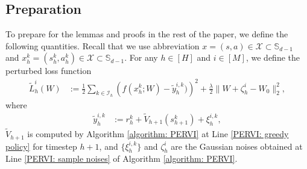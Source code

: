 \documentclass{article} \usepackage{iclr2023/iclr2023_conference,times}
\begin{document}
\subsection{Preparation}
To prepare for the lemmas and proofs in the rest of the paper, we define the following quantities. Recall that we use abbreviation $x = (s,a) \in \mathcal{X} \subset \mathbb{S}_{d-1}$ and $x^k_h = (s^k_h, a^k_h) \in \mathcal{X} \subset \mathbb{S}_{d-1}$. For any $h \in [H]$ and $i \in [M]$, we define the perturbed loss function
\begin{align}
    \tilde{L}_h^i(W) &:= \frac{1}{2}\sum_{k \in \mathcal{I}_h} \left( f(x^k_h; W) - \tilde{y}^{i,k}_h ) \right)^2 + \frac{\lambda}{2} \| W + \zeta^i_h - W_0 \|_2^2, 
    \label{eq: perturbed loss function}
\end{align}
where
\begin{align*}
    \tilde{y}^{i,k}_h &:= r^k_h + \tilde{V}_{h+1}(s^k_{h+1}) + \xi^{i,k}_h,
\end{align*}
$\tilde{V}_{h+1}$ is computed by Algorithm \ref{algorithm: PERVI} at Line \ref{PERVI: greedy policy} for timestep $h+1$, and $\{\xi^{i,k}_h\}$ and $\zeta^i_h$ are the Gaussian noises obtained at Line \ref{PERVI: sample noises} of Algorithm \ref{algorithm: PERVI}. 
\end{document}
